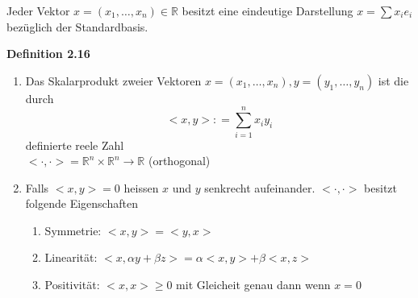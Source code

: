 Jeder Vektor $x=\left(x_1,\dots,x_n \right)\in\mathbb{R}$ besitzt eine eindeutige Darstellung $x=\sum x_ie_i$ bezüglich der Standardbasis.

\begin{framed}
\centerline{\textbf{Definition 2.16}}
\begin{enumerate}
\item Das Skalarprodukt zweier Vektoren $x=\left(x_1,\dots,x_n \right),y=\left(y_1,\dots,y_n \right)$ ist die durch \[ < x,y > : = \sum\limits_{i = 1}^n {{x_i}{y_i}} \] definierte reele Zahl\\ $<\cdot,\cdot>=\mathbb{R}^n\times\mathbb{R}^n\rightarrow\mathbb{R}$ (orthogonal)
\item Falls $<x,y>=0$ heissen $x$ und $y$ senkrecht aufeinander. $<\cdot,\cdot>$ besitzt folgende Eigenschaften
\begin{enumerate}
\item Symmetrie: $<x,y>=<y,x>$
\item Linearität: $<x,\alpha y+\beta z>=\alpha <x,y>+\beta <x,z>$
\item Positivität: $<x,x>\geq 0$ mit Gleicheit genau dann wenn $x=0$
\end{enumerate}
\end{enumerate}
\end{framed}

